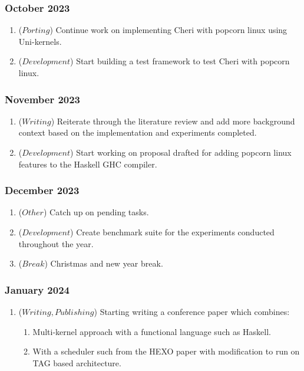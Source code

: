  \subsubsection{October 2023}
  \begin{enumerate}
    \item (\(Porting\)) Continue work on implementing Cheri with popcorn linux using Uni-kernels. 
    \item (\(Development\)) Start building a test framework to test Cheri with popcorn linux.
 \end{enumerate}

 \subsubsection{November 2023}
  \begin{enumerate}
    \item (\(Writing\)) Reiterate through the literature review and add more background context based on the implementation and experiments 
    completed.
    \item (\(Development\)) Start working on proposal drafted for adding popcorn linux features to the Haskell GHC compiler.
 \end{enumerate}

 \subsubsection{December 2023}
  \begin{enumerate}
    \item (\(Other\)) Catch up on pending tasks.
    \item (\(Development\)) Create benchmark suite for the experiments conducted throughout the year.
    \item (\(Break\)) Christmas and new year break.
 \end{enumerate}

 \subsubsection{January 2024}
  \begin{enumerate}
    \item (\(Writing, Publishing\)) Starting writing a conference paper which combines:
    \begin{enumerate}
        \item Multi-kernel approach with a functional language such as Haskell.
        \item With a scheduler such from the HEXO paper with modification to run on TAG based architecture. 
      \end{enumerate}
 \end{enumerate}

